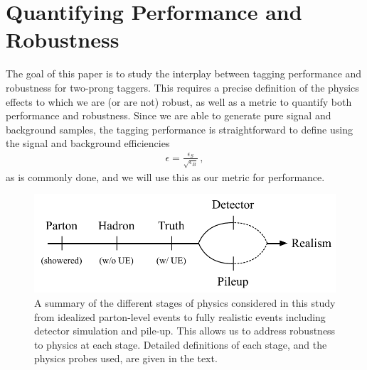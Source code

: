 \documentclass[11pt,letterpaper]{article}
\begin{document}
\section{Quantifying Performance and Robustness}\label{sec:pres}


The goal of this paper is to study the interplay between tagging performance and robustness for two-prong taggers.
%
This requires a precise definition of the physics effects to which we are (or are not) robust, as well as a metric to quantify both performance and robustness.
%
Since we are able to generate pure signal and background samples, the tagging performance is straightforward to define using the signal and background efficiencies 
\begin{align}
\epsilon=\frac{\epsilon_S}{\sqrt{\epsilon_B}}\,,
\end{align}
as is commonly done, and we will use this as our metric for performance.

\begin{figure}[t]
\begin{center}
\includegraphics[width=0.75\columnwidth]{figures/realism_levels}
\end{center}
\caption{A summary of the different stages of physics considered in
  this study from idealized parton-level events to fully realistic
  events including detector simulation and pile-up.
  This allows us to
  address robustness to physics at each stage.
  Detailed definitions of
  each stage, and the physics probes used, are given in the text.
   }
\label{fig:realism}
\end{figure}
\end{document}
